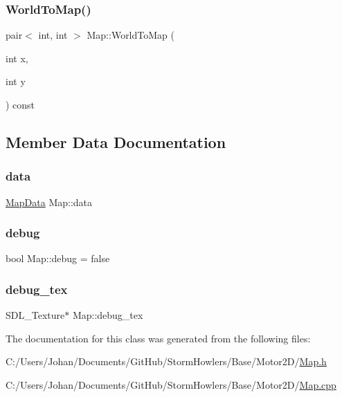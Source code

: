 \mbox{\label{class_map_a5029898cd2fb95823117428b6f02ddd4}} 
\subsubsection{\texorpdfstring{WorldToMap()}{WorldToMap()}}
{\footnotesize\ttfamily pair$<$ int, int $>$ Map\+::\+World\+To\+Map (\begin{DoxyParamCaption}\item[{int}]{x,  }\item[{int}]{y }\end{DoxyParamCaption}) const}



\subsection{Member Data Documentation}
\mbox{\label{class_map_a19a9af67d7d9ce62ab11bc52b204ad8b}} 
\subsubsection{\texorpdfstring{data}{data}}
{\footnotesize\ttfamily \mbox{\hyperlink{struct_map_data}{Map\+Data}} Map\+::data}

\mbox{\label{class_map_adeb158eea4e62856e831377972063aa5}} 
\subsubsection{\texorpdfstring{debug}{debug}}
{\footnotesize\ttfamily bool Map\+::debug = false}

\mbox{\label{class_map_a267ec15b70252a94a471255e1a8eb02d}} 
\subsubsection{\texorpdfstring{debug\_tex}{debug\_tex}}
{\footnotesize\ttfamily S\+D\+L\+\_\+\+Texture$\ast$ Map\+::debug\+\_\+tex}



The documentation for this class was generated from the following files\+:\begin{DoxyCompactItemize}
\item 
C\+:/\+Users/\+Johan/\+Documents/\+Git\+Hub/\+Storm\+Howlers/\+Base/\+Motor2\+D/\mbox{\hyperlink{_map_8h}{Map.\+h}}\item 
C\+:/\+Users/\+Johan/\+Documents/\+Git\+Hub/\+Storm\+Howlers/\+Base/\+Motor2\+D/\mbox{\hyperlink{_map_8cpp}{Map.\+cpp}}\end{DoxyCompactItemize}
